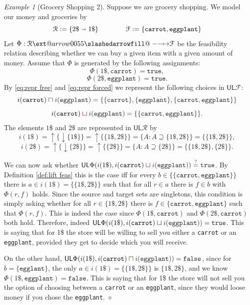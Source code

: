 \documentclass[12pt]{article}
\makeatletter
\theoremstyle{definition}
\theoremstyle{plain}
\theoremstyle{plain}
\theoremstyle{plain}
\theoremstyle{plain}
\theoremstyle{remark}
\newtheorem{example}[definition]{Example}
\newcommand\xqed[1]{%
	\leavevmode\unskip\penalty9999 \hbox{}\nobreak\hfill
	\quad\hbox{#1}}
\newcommand\exampleend{\xqed{$\diamond$}}
\theoremstyle{remark}
\newcommand{\mc}[1]{\mathcal{#1}}
\newcommand{\low}{\mathsf{L}}
\newcommand{\upper}{\mathsf{U}}
\newcommand{\true}{\mathtt{true}}
\newcommand{\false}{\mathtt{false}}
\newcommand{\upc}[1]{{\uparrow #1}}
\newcommand{\lwc}[1]{{\downarrow #1}}
\def\slashedarrowfill@#1#2#3#4#5{%
	$\m@th\thickmuskip0mu\medmuskip\thickmuskip\thinmuskip\thickmuskip
	\relax#5#1\mkern-7mu%
	\cleaders\hbox{$#5\mkern-2mu#2\mkern-2mu$}\hfill
	\mathclap{#3}\mathclap{#2}%
	\cleaders\hbox{$#5\mkern-2mu#2\mkern-2mu$}\hfill
	\mkern-7mu#4$%
}
\def\rightslashedarrowfill@{%
	\slashedarrowfill@\relbar\relbar\mapstochar\rightarrow}
\newcommand\xslashedrightarrow[2][]{%
	\ext@arrow 0055{\rightslashedarrowfill@}{#1}{#2}}
\newcommand{\csqcap}{\color{OliveGreen}\bm{\sqcap}\color{Black}}
\newcommand{\csqcup}{\color{BrickRed}\bm{\sqcup}\color{Black}}
\makeatother
\begin{document}
\begin{example}[Grocery Shopping 2]\label{ex:groceries 2}
	Suppose we are grocery shopping. We model our money and groceries by $$\mc{R} := \{2\$ \shortrightarrow 1\$\} \qquad \qquad \mc{F} := \{\mathtt{carrot}, \mathtt{eggplant} \}$$
	Let $\Phi: \mc{R} \xslashedrightarrow{} \mc{F}$ be the feasibility relation describing whether we can buy a given item with a given amount of money. Assume that $\Phi$ is generated by the following assignments:
	$$\Phi(1\$,\mathtt{carrot}) = \true,$$
	$$\Phi(2\$,\mathtt{eggplant}) = \true.$$
	By \eqref{eq:repr free} and \eqref{eq:repr forced} we represent the following choices in $\upper\low\mc{F}$:
	$$i(\mathtt{carrot}) \csqcap i(\mathtt{eggplant}) = \{ \{\mathtt{carrot}\},\{\mathtt{eggplant}\}, \{ \mathtt{carrot}, \mathtt{eggplant} \} \}$$ 
	$$i(\mathtt{carrot}) \csqcup i(\mathtt{eggplant}) = \{ \{ \mathtt{carrot}, \mathtt{eggplant} \} \}.$$
	The elements $1\$$ and $2\$$ are represented in $\upper\low\mc{R}$ by
	$$i(1\$) = \upc\{\lwc\{ 1\$ \} \} = \upc \{ \{1\$, 2\$\} \} = \{A : A \supseteq \{1\$, 2\$ \} \} = \{ \{ 1\$,2\$\} \},$$
	$$i(2\$) = \upc\{\lwc\{ 2\$ \} \} = \upc \{ \{2\$\} \} = \{A : A \supseteq  \{2\$\} \} = \{ \{1\$, 2\$ \}, \{2\$\}  \}.$$
	
	We can now ask whether $\upper\low\Phi(i(1\$), i(\mathtt{carrot}) \csqcup i(\mathtt{eggplant})) \stackrel{?}{=} \true$. By Definition \ref{def:lift feas} this is the case iff for every $b \in \{ \{ \mathtt{carrot}, \mathtt{eggplant} \} \}$ there is $a \in i(1\$) = \{ \{ 1\$,2\$\} \}$ such that for all $r \in a$ there is $f \in b$ with $\Phi(r,f)$ holds. Since the source and target sets are singletons, this condition is simply asking whether for all $r \in \{ 1\$, 2\$ \}$ there is $f \in \{ \mathtt{carrot}, \mathtt{eggplant} \}$ such that $\Phi(r,f)$. This is indeed the case since $\Phi(1\$,\mathtt{carrot})$ and $\Phi(2\$,\mathtt{carrot})$ both hold. Therefore, indeed $\upper\low\Phi(i(1\$), i(\mathtt{carrot}) \csqcup i(\mathtt{eggplant})) = \true$. This is saying that for 1\$ the store will be willing to sell you either a \texttt{carrot} or an \texttt{eggplant}, provided they get to decide which you will receive.
	
	On the other hand, $\upper\low\Phi(i(1\$), i(\mathtt{carrot}) \csqcap i(\mathtt{eggplant})) = \false$, since for $b = \{\mathtt{egglant}\}$, the only $a \in i(1\$) = \{ \{ 1\$,2\$\} \}$ is $\{1\$, 2\$ \}$, and we know $\Phi(1\$,\mathtt{eggplant}) = \false$. This is saying that for 1\$ the store will not sell you the option of choosing between a \texttt{carrot} or an \texttt{eggplant}, since they would loose money if you chose the \texttt{eggplant}. \exampleend
\end{example}
\end{document}
